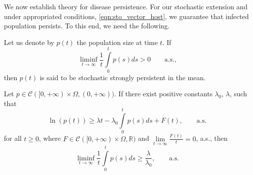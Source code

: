 We now establish theory for disease persistence.
For our stochastic extension and under appropriated 
conditions, \eqref{eqn:sto_vector_host},
we guarantee that infected population persists. To this end, 
we need the following.

\begin{definition} \label{def.pers}
    Let us denote by $p(t)$ the  population size at time $t$. 
    If
    $$\displaystyle
        \liminf\limits_{t\to\infty}
        \frac{1}{t}
        \int\limits_{0}^{t}p(s)ds >0 \qquad \text{a.s.,}
    $$
    then $p(t)$ is said to be stochastic strongly persistent in the mean.
\end{definition}
%
\begin{lemma}[{\citet[Lemma 5.1]{Ji2014}}]\label{lem:log_Gronwall}
    Let $p\in \mathcal{C}([0,+\infty)\times\Omega,(0,+\infty))$. If there exist 
    positive constants 
    $
        \lambda_{0}
    $, 
    $
        \lambda
    $, such that 
    $$
        \ln(p(t))\geq 
        \lambda t - \lambda_{0}
        \int\limits_{0}^{t} 
        p(s)
        ds 
        + 
        F(t), \qquad\text{a.s.}
    $$
    for all $t\geq 0$, where 
    $
        F\in \mathcal{C}([0,+\infty)\times\Omega,\mathbb{R})
    $ 
    and 
    $
        \displaystyle
        \lim
        \limits_{t\to \infty}\frac{F(t)}{t}=0
    $, 
    a.s., then
    $$
        \liminf
        \limits_{t\to\infty}
        \frac{1}{t}
        \int\limits_{0}^{t}
            p(s)
        ds 
        \geq 
        \frac{\lambda}{\lambda_{0}},
        \qquad
        \text{a.s.}
    $$
\end{lemma}



